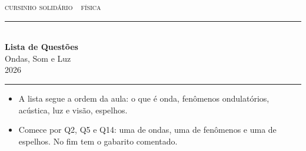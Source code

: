 \documentclass[11pt,a4paper]{article}
\begin{document}

\thispagestyle{empty}

{\scshape\color{vinho}cursinho solid\'ario \,\textperiodcentered\, f\'isica}\\[-0.5em]
{\color{vinho}\rule{\linewidth}{1.6pt}}\\[0.9em]
{\huge\bfseries Lista de Quest\~oes}\\[0.35em]
{\LARGE Ondas, Som e Luz}\\[0.7em]
\hfill {\color{grafite}2026}\\[-0.3em]
{\color{black!30}\rule{\linewidth}{0.5pt}}

\vspace{1.0em}

\begin{painel}
\begin{itemize}[nosep, leftmargin=1.5em]
  \item A lista segue a ordem da aula: o que \'e onda, fen\^omenos
        ondulat\'orios, ac\'ustica, luz e vis\~ao, espelhos.
  \item Comece por Q2, Q5 e Q14: uma de ondas, uma de fen\^omenos e uma de
        espelhos. No fim tem o gabarito comentado.
\end{itemize}
\end{painel}

\newpage
\end{document}
